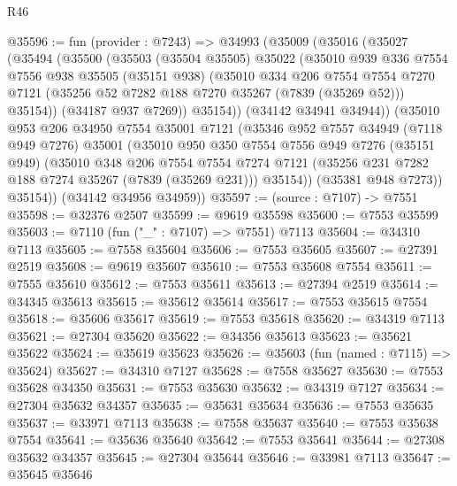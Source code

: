\begin{lexlean}{R46}
\begin{coremodule}
@35596 := fun (provider : @7243) =>
  @34993
    (@35009
      (@35016
        (@35027
          (@35494
            (@35500
              (@35503
                (@35504 @35505)
                @35022
                (@35010
                  @939
                  @336
                  @7554
                  @7556
                  @938
                  @35505
                  (@35151 @938)
                  (@35010
                    @334
                    @206
                    @7554
                    @7554
                    @7270
                    @7121
                    (@35256 @52 @7282 @188 @7270 @35267 (@7839 (@35269 @52)))
                    @35154))
                (@34187 @937 @7269))
              @35154))
          (@34142 @34941 @34944))
        (@35010
          @953
          @206
          @34950
          @7554
          @35001
          @7121
          (@35346
            @952
            @7557
            @34949
            (@7118 @949 @7276)
            @35001
            (@35010
              @950
              @350
              @7554
              @7556
              @949
              @7276
              (@35151 @949)
              (@35010
                @348
                @206
                @7554
                @7554
                @7274
                @7121
                (@35256 @231 @7282 @188 @7274 @35267 (@7839 (@35269 @231)))
                @35154))
            (@35381 @948 @7273))
          @35154))
      (@34142 @34956 @34959))
@35597 := (source : @7107) -> @7551
@35598 := @32376 @2507
@35599 := @9619 @35598
@35600 := @7553 @35599
@35603 := @7110 (fun ("_" : @7107) => @7551) @7113
@35604 := @34310 @7113
@35605 := @7558 @35604
@35606 := @7553 @35605
@35607 := @27391 @2519
@35608 := @9619 @35607
@35610 := @7553 @35608 @7554
@35611 := @7555 @35610
@35612 := @7553 @35611
@35613 := @27394 @2519
@35614 := @34345 @35613
@35615 := @35612 @35614
@35617 := @7553 @35615 @7554
@35618 := @35606 @35617
@35619 := @7553 @35618
@35620 := @34319 @7113
@35621 := @27304 @35620
@35622 := @34356 @35613
@35623 := @35621 @35622
@35624 := @35619 @35623
@35626 := @35603 (fun (named : @7115) => @35624)
@35627 := @34310 @7127
@35628 := @7558 @35627
@35630 := @7553 @35628 @34350
@35631 := @7553 @35630
@35632 := @34319 @7127
@35634 := @27304 @35632 @34357
@35635 := @35631 @35634
@35636 := @7553 @35635
@35637 := @33971 @7113
@35638 := @7558 @35637
@35640 := @7553 @35638 @7554
@35641 := @35636 @35640
@35642 := @7553 @35641
@35644 := @27308 @35632 @34357
@35645 := @27304 @35644
@35646 := @33981 @7113
@35647 := @35645 @35646

\end{coremodule}
\end{lexlean}
